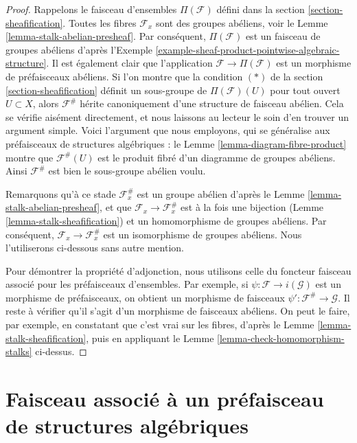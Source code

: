 \begin{proof}
Rappelons le faisceau d'ensembles $\Pi(\mathcal{F})$ défini dans la
section \ref{section-sheafification}. Toutes les fibres
$\mathcal{F}_x$ sont des groupes abéliens, voir le
Lemme \ref{lemma-stalk-abelian-presheaf}.
Par conséquent, $\Pi(\mathcal{F})$ est un faisceau de groupes abéliens d'après
l'Exemple \ref{example-sheaf-product-pointwise-algebraic-structure}.
Il est également clair que l'application $\mathcal{F} \to \Pi(\mathcal{F})$
est un morphisme de préfaisceaux abéliens. Si l'on montre que
la condition $(*)$ de la section \ref{section-sheafification} définit un sous-groupe
de $\Pi(\mathcal{F})(U)$ pour tout ouvert $U \subset X$,
alors $\mathcal{F}^\#$ hérite canoniquement d'une structure de faisceau abélien.
Cela se vérifie aisément directement, et nous laissons au
lecteur le soin d'en trouver un argument simple. Voici l'argument que nous employons,
qui se généralise aux préfaisceaux de structures algébriques :
le Lemme \ref{lemma-diagram-fibre-product} montre que
$\mathcal{F}^\#(U)$ est le produit fibré d'un diagramme
de groupes abéliens. Ainsi $\mathcal{F}^\#$ est bien le
sous-groupe abélien voulu.

\medskip\noindent
Remarquons qu'à ce stade $\mathcal{F}^\#_x$ est un groupe
abélien d'après le Lemme \ref{lemma-stalk-abelian-presheaf},
et que $\mathcal{F}_x \to \mathcal{F}^\#_x$ est à la fois une
bijection (Lemme \ref{lemma-stalk-sheafification})
et un homomorphisme de groupes abéliens. Par conséquent,
$\mathcal{F}_x \to \mathcal{F}^\#_x$ est un isomorphisme
de groupes abéliens. Nous l'utiliserons ci-dessous sans autre mention.

\medskip\noindent
Pour démontrer la propriété d'adjonction, nous utilisons celle du
foncteur faisceau associé pour les préfaisceaux d'ensembles. Par exemple,
si $\psi : \mathcal{F} \to i(\mathcal{G})$ est un morphisme de préfaisceaux,
on obtient un morphisme de faisceaux
$\psi' : \mathcal{F}^\# \to \mathcal{G}$. Il reste à vérifier
qu'il s'agit d'un morphisme de faisceaux abéliens. On peut le faire,
par exemple, en constatant que c'est vrai sur les fibres,
d'après le Lemme \ref{lemma-stalk-sheafification}, puis en appliquant le
Lemme \ref{lemma-check-homomorphism-stalks} ci-dessus.
\end{proof}



\section{Faisceau associé à un préfaisceau de structures algébriques}
\label{section-sheafification-presheaves-structures}


